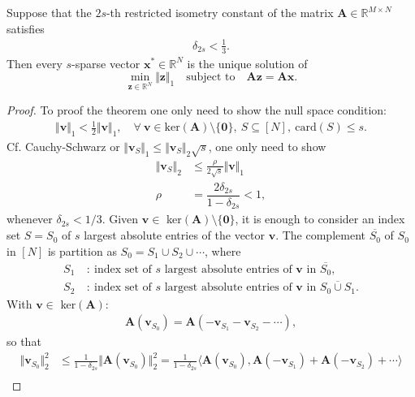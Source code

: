 \begin{theorem}
Suppose that the $2s$-th restricted isometry constant of the matrix $\mathbf{A} \in \mathbb{R}^{M \times N}$ satisfies
\begin{align*}
    \delta_{2s} < \frac{1}{3}.
\end{align*}
Then every $s$-sparse vector $\mathbf{x}^\ast \in \mathbb{R}^N$ is the unique solution of
$$
\min_{\mathbf{z} \in \mathbb{R}^N} \Vert \mathbf{z} \Vert_1 \quad \text{subject to} \quad \mathbf{Az} = \mathbf{Ax}.
$$
\end{theorem}
\begin{proof}
To proof the theorem one only need to show the null space condition:
\begin{align*}
\Vert \mathbf{v} \Vert_1 < \frac{1}{2} \Vert \mathbf{v} \Vert_1, \quad \forall \ \mathbf{v} \in \text{ker}(\mathbf{A})\setminus \{\mathbf{0}\}, \ S \subseteq [N], \ \text{card}(S) \leq s.
\end{align*}
Cf. Cauchy-Schwarz or $\Vert \mathbf{v}_S \Vert_1 \leq \Vert \mathbf{v}_S \Vert_2 \sqrt{s}$, one only need to show
\begin{align*}
\Vert \mathbf{v}_S \Vert_2 &\leq \frac{\rho}{2 \sqrt{s}} \Vert \mathbf{v} \Vert_1 \\
\rho &= \dfrac{2 \delta_{2s}}{1 - \delta_{2s}} < 1,
\end{align*}
whenever $\delta_{2s} < 1/3$. Given $\mathbf{v} \in$ ker$(\mathbf{A})\setminus \{\mathbf{0}\}$, it is enough to consider an index set $S = S_0$ of $s$ largest absolute entries of the vector $\mathbf{v}$. The complement $\overline{S_0}$ of $S_0$ in $[N]$ is partition as $S_0 = S_1 \cup S_2 \cup \cdots$, where
\begin{align*}
    S_1 \ &: \ \text{index set of } s \text{ largest absolute entries of } \textbf{v} \text{ in } \overline{S_0}, \\
    S_2 \ &: \ \text{index set of } s \text{ largest absolute entries of } \textbf{v} \text{ in } \overline{S_0 \cup S_1}.
\end{align*}
With $\mathbf{v} \in$ ker$(\mathbf{A})$:
\begin{align*}
\mathbf{A}(\mathbf{v}_{S_0}) = \mathbf{A}(-\mathbf{v}_{S_1} - \mathbf{v}_{S_2} - \cdots),
\end{align*}
so that
\begin{align}\label{eq:L9_6}
\Vert \textbf{v}_{S_0} \Vert_2^2 &\leq \frac{1}{1 - \delta_{2s}} \Vert \textbf{A}(\textbf{v}_{S_0}) \Vert_2^2 = \frac{1}{1 - \delta_{2s}} \langle \textbf{A}(\textbf{v}_{S_0}), \textbf{A}(-\textbf{v}_{S_1}) + \textbf{A}(-\textbf{v}_{S_2}) + \cdots \rangle \nonumber \\

\end{align}
\end{proof}
